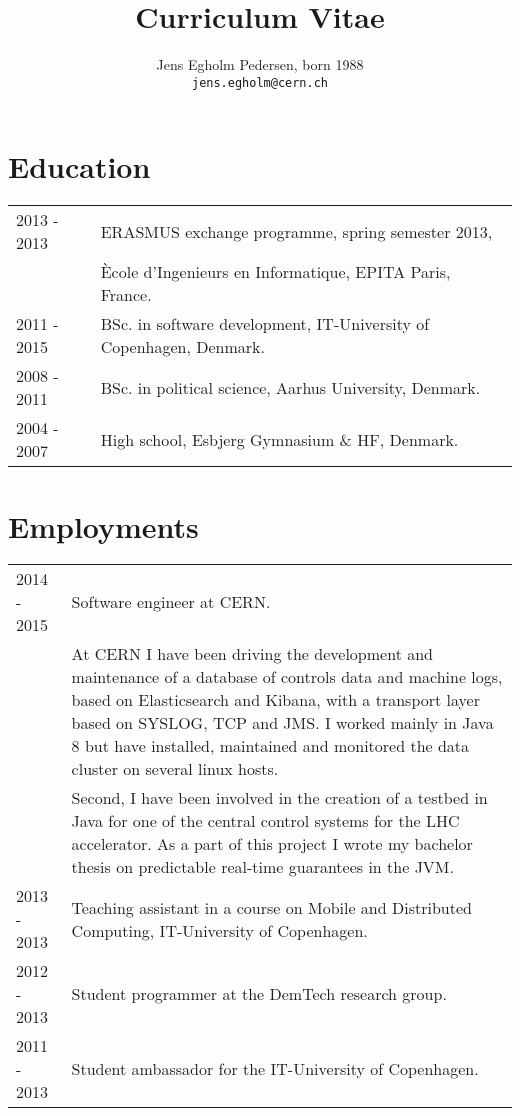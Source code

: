 \documentclass[12pt,a4paper,notitlepage]{article}
\author{Jens Egholm Pedersen, born 1988 
\\ \texttt{jens.egholm@cern.ch}
}
\title{Curriculum Vitae}
\begin{document}
\maketitle
\section*{Education}
\begin{tabularx}{\textwidth}{l X}
2013 - 2013 & ERASMUS exchange programme, spring semester 2013, \\
            & Ècole d'Ingenieurs en Informatique, EPITA Paris, France. \\
2011 - 2015 & BSc. in software development, IT-University of Copenhagen, Denmark. \\
2008 - 2011 & BSc. in political science, Aarhus University, Denmark. \\
2004 - 2007 & High school, Esbjerg Gymnasium \& HF, Denmark.
\end{tabularx}

\section*{Employments}
\begin{tabularx}{\textwidth}{l X}
2014 - 2015 & Software engineer at CERN. \\
            & At CERN I have been driving the development and maintenance of a database 
of controls data and machine logs, based on Elasticsearch and Kibana, with a transport layer based on SYSLOG, TCP and JMS.
I worked mainly in Java 8 but have installed, maintained and monitored the data cluster on several linux hosts. \\
            & Second, I have been involved in the creation of a testbed in Java for one of the central control systems
for the LHC accelerator. As a part of this project I wrote my bachelor thesis on predictable real-time guarantees in the JVM. \\
2013 - 2013 & Teaching assistant in a course on Mobile and Distributed Computing, IT-University of Copenhagen. \\
2012 - 2013 & Student programmer at the DemTech research group. \\
2011 - 2013 & Student ambassador for the IT-University of Copenhagen.
\end{tabularx}
\end{document}
